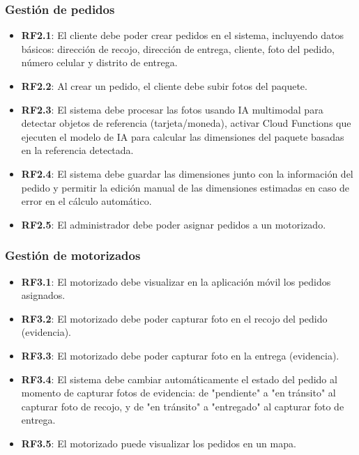 \subsubsection{Gestión de pedidos}

\begin{itemize}
    \item \textbf{RF2.1}: El cliente debe poder crear pedidos en el sistema, incluyendo datos básicos: dirección de recojo, dirección de entrega, cliente, foto del pedido, número celular y distrito de entrega.
    
    \item \textbf{RF2.2}: Al crear un pedido, el cliente debe subir fotos del paquete.
    
    \item \textbf{RF2.3}: El sistema debe procesar las fotos usando IA multimodal para detectar objetos de referencia (tarjeta/moneda), activar Cloud Functions que ejecuten el modelo de IA para calcular las dimensiones del paquete basadas en la referencia detectada.
    
    \item \textbf{RF2.4}: El sistema debe guardar las dimensiones junto con la información del pedido y permitir la edición manual de las dimensiones estimadas en caso de error en el cálculo automático.
    
    \item \textbf{RF2.5}: El administrador debe poder asignar pedidos a un motorizado.
\end{itemize}

\subsubsection{Gestión de motorizados}

\begin{itemize}
    \item \textbf{RF3.1}: El motorizado debe visualizar en la aplicación móvil los pedidos asignados.
    \item \textbf{RF3.2}: El motorizado debe poder capturar foto en el recojo del pedido (evidencia).
    \item \textbf{RF3.3}: El motorizado debe poder capturar foto en la entrega (evidencia).
    \item \textbf{RF3.4}: El sistema debe cambiar automáticamente el estado del pedido al momento de capturar fotos de evidencia: de "pendiente" a "en tránsito" al capturar foto de recojo, y de "en tránsito" a "entregado" al capturar foto de entrega.
    \item \textbf{RF3.5}: El motorizado puede visualizar los pedidos en un mapa.
\end{itemize}

